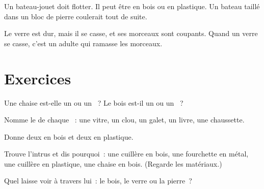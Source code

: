 \begin{example}[Un bateau]\label{ex:g1:materials-around-us:boat}
Un bateau-jouet doit flotter. Il peut être en bois ou en plastique. Un
bateau taillé dans un bloc de pierre coulerait tout de suite.
\end{example}

\begin{remark}\label{rem:g1:materials-around-us:glass}
Le verre est dur, mais il se casse, et ses morceaux sont coupants. Quand
un verre se casse, c'est un adulte qui ramasse les morceaux.
\end{remark}

\section{Exercices}

\begin{exercise}[$\star$]\label{exo:g1:materials-around-us:1}
Une chaise est-elle un  ou un ~? Le bois est-il un  ou
un ~?
\end{exercise}

\begin{exercise}[$\star$]\label{exo:g1:materials-around-us:2}
Nomme le  de chaque ~: une vitre, un clou, un galet, un
livre, une chaussette.
\end{exercise}

\begin{exercise}[$\star$]\label{exo:g1:materials-around-us:3}
Donne deux  en bois et deux  en plastique.
\end{exercise}

\begin{exercise}[$\star$]\label{exo:g1:materials-around-us:4}
Trouve l'intrus et dis pourquoi~: une cuillère en bois, une fourchette
en métal, une cuillère en plastique, une chaise en bois. (Regarde les
matériaux.)
\end{exercise}

\begin{exercise}[$\star$]\label{exo:g1:materials-around-us:5}
Quel  laisse voir à travers lui~: le bois, le verre ou la pierre~?
\end{exercise}

